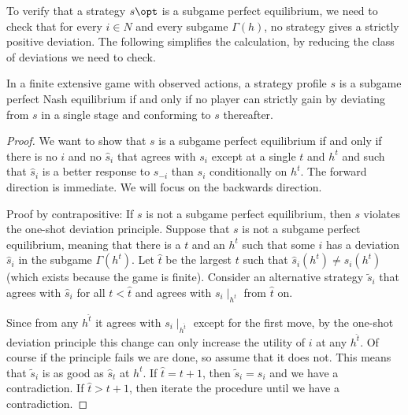 \documentclass[10pt]{article}
\begin{document}
\begin{remark}
	To verify that a strategy $s\opt$ is a subgame perfect equilibrium, we need to check that for every $i \in N$ and every subgame $\Gamma(h)$, no strategy gives a strictly positive deviation. The following simplifies the calculation, by reducing the class of deviations we need to check.
\end{remark}

\begin{theorem}
	 In a finite extensive game with observed actions, a strategy profile $s$ is a subgame perfect Nash equilibrium if and only if no player can strictly gain by deviating from $s$ in a single stage and conforming to $s$ thereafter.
\end{theorem}
\begin{proof}
	We want to show that $s$ is a subgame perfect equilibrium if and only if there is no $i$ and no $\hat{s}_i$ that agrees with $s_i$ except at a single $t$ and $h^t$ and such that $\hat{s}_i$ is a better response to $s_{-i}$ than $s_i$ conditionally on $h^t$. The forward direction is immediate. We will focus on the backwards direction.
	
	Proof by contrapositive: If $s$ is not a subgame perfect equilibrium, then $s$ violates the one-shot deviation principle. Suppose that $s$ is not a subgame perfect equilibrium, meaning that there is a $t$ and an $h^t$ such that some $i$ has a deviation $\hat{s}_i$ in the subgame $\Gamma(h^t)$. Let $\hat{t}$ be the largest $t$ such that $\hat{s}_i(h^t) \ne s_i(h^t)$ (which exists because the game is finite). Consider an alternative strategy $\tilde{s}_i$ that agrees with $\hat{s}_i$ for all $t < \hat{t}$ and agrees with $s_i\mid_{h^t}$ from $\hat{t}$ on. 
	
	Since from any $h^{\hat{t}}$ it agrees with $s_i \mid_{h^{\hat{t}}}$ except for the first move, by the one-shot deviation principle this change can only increase the utility of $i$ at any $h^{\hat{t}}$. Of course if the principle fails we are done, so assume that it does not. This means that $\tilde{s}_i$ is as good as $\hat{s}_t$ at $h^{t}$. If $\hat{t} = t+1$, then $\tilde{s}_i = s_i$ and we have a contradiction. If $\hat{t} > t+1$, then iterate the procedure until we have a contradiction. 
\end{proof}
\end{document}
